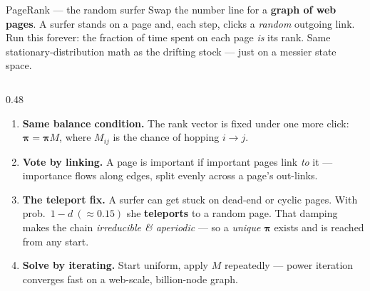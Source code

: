 \documentclass[aspectratio=169,10pt]{beamer}
\newif\ifkick \kickfalse
\newcommand{\kick}[1]{\def\thekicker{#1}\kicktrue}
\begin{document}
\begin{frame}[t,shrink=5]{PageRank --- the random surfer}
\kick{Where this shows up \ \textbullet\ \ deep dive}
\small Swap the number line for a \textbf{graph of web pages}. A surfer stands on a page and, each step, clicks a \emph{random} outgoing link. Run this forever: the fraction of time spent on each page \emph{is} its rank. Same stationary-distribution math as the drifting stock --- just on a messier state space.

\begin{columns}[t,onlytextwidth]
  
  \begin{column}{0.48\textwidth}\footnotesize
    \vspace{-2.5 cm}
    \begin{enumerate}\setlength\itemsep{0pt}
      \item \textbf{Same balance condition.} The rank vector is fixed under one more click: $\boldsymbol\pi = \boldsymbol\pi M$, where $M_{ij}$ is the chance of hopping $i\!\to\! j$.
      \item \textbf{Vote by linking.} A page is important if important pages link \emph{to} it --- importance flows along edges, split evenly across a page's out-links.
      \item \textbf{The teleport fix.} A surfer can get stuck on dead-end or cyclic pages. With prob.\ $1{-}d\ (\approx0.15)$ she \textbf{teleports} to a random page. That damping makes the chain \emph{irreducible \& aperiodic} --- so a \emph{unique} $\boldsymbol\pi$ exists and is reached from any start.
      \item \textbf{Solve by iterating.} Start uniform, apply $M$ repeatedly --- power iteration converges fast on a web-scale, billion-node graph.
    \end{enumerate}
  \end{column}
  

\end{columns}
\end{frame}
\end{document}

